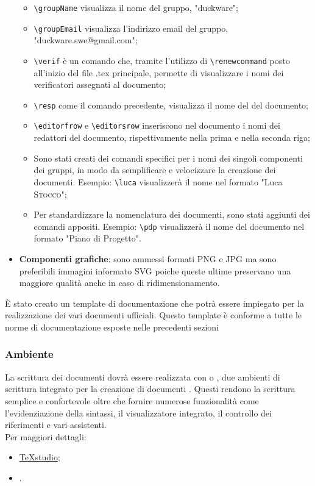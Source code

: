 \begin{itemize}
	\begin{itemize}
		\item \texttt{\textbackslash groupName} visualizza il nome del gruppo, "duckware";
		\item \texttt{\textbackslash groupEmail} visualizza l'indirizzo email del gruppo, "duckware.swe@gmail.com";
		\item \texttt{\textbackslash verif} è un comando che, tramite l'utilizzo di \texttt{\textbackslash renewcommand} posto all'inizio del file .tex principale, permette di visualizzare i nomi dei verificatori assegnati al documento;
		\item \texttt{\textbackslash resp} come il comando precedente, visualizza il nome del  del documento;
		\item \texttt{\textbackslash editorfrow} e \texttt{\textbackslash editorsrow} inseriscono nel documento i nomi dei redattori del documento, rispettivamente nella prima e nella seconda riga;
		\item Sono stati creati dei comandi specifici per i nomi dei singoli componenti dei gruppi, in modo da semplificare e velocizzare la creazione dei documenti. Esempio: \texttt{\textbackslash luca} visualizzerà il nome nel formato "Luca \textsc{Stocco}";
		\item Per standardizzare la nomenclatura dei documenti, sono stati aggiunti dei comandi appositi. Esempio: \texttt{\textbackslash pdp} visualizzerà il nome del documento nel formato "Piano di Progetto".
	\end{itemize}
	\item \textbf{Componenti grafiche}: sono ammessi formati PNG e JPG ma sono preferibili immagini informato SVG poiche queste ultime preservano una maggiore qualità anche in caso di ridimensionamento.
\end{itemize}
È stato creato un template di documentazione che potrà essere impiegato per la realizzazione dei vari documenti ufficiali. Questo template è conforme a tutte le norme di documentazione esposte nelle precedenti sezioni
\subsubsection{Ambiente}
La scrittura dei documenti dovrà essere realizzata con  o , due ambienti di scrittura integrato per la creazione di documenti . Questi  rendono la scrittura  semplice e confortevole oltre che fornire numerose funzionalità come l'evidenziazione della sintassi, il visualizzatore integrato, il controllo dei riferimenti e vari assistenti.\\Per maggiori dettagli:
\begin{itemize}
	\item  \href{https://www.texstudio.org/}{TeXstudio};
	\item  \href{http://www.xm1math.net/texmaker/}{}.
\end{itemize}
